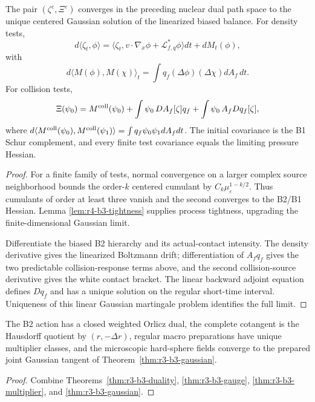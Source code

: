 \begin{theorem}
\label{thm:r3-b3-gaussian}
The pair \((\zeta^\varepsilon,\Xi^\varepsilon)\) converges in the preceding
nuclear dual path space to the unique centered Gaussian solution of the
linearized biased balance.  For density tests,
\[
 d\langle\zeta_t,\phi\rangle
 =\langle\zeta_t,
 v\cdot\nabla_x\phi+\mathcal L_{f,q}^*\phi\rangle dt
 +dM_t(\phi),
\]
with
\[
 d\langle M(\phi),M(\chi)\rangle_t
 =\int q_f(\Delta\phi)(\Delta\chi)dA_f\,dt.
\]
For collision tests,
\[
 \Xi(\psi_0)
 =M^{\rm coll}(\psi_0)
 +\int\psi_0\,D A_f[\zeta]q_f
 +\int\psi_0\,A_fDq_f[\zeta],
\]
where
\(d\langle M^{\rm coll}(\psi_0),M^{\rm coll}(\psi_1)\rangle
 =\int q_f\psi_0\psi_1dA_fdt\).
The initial covariance is the B1 Schur complement, and every finite test
covariance equals the limiting pressure Hessian.
\end{theorem}

\begin{proof}
For a finite family of tests, normal convergence on a larger complex source
neighborhood bounds the order-\(k\) centered cumulant by
\(C_k\mu_\varepsilon^{1-k/2}\).  Thus cumulants of order at least three
vanish and the second converges to the B2/B1 Hessian.  Lemma
\ref{lem:r4-b3-tightness} supplies process tightness, upgrading the
finite-dimensional Gaussian limit.

Differentiate the biased B2 hierarchy and its actual-contact intensity.  The
density derivative gives the linearized Boltzmann drift; differentiation of
\(A_fq_f\) gives the two predictable collision-response terms above, and the
second collision-source derivative gives the white contact bracket.  The
linear backward adjoint equation defines \(Dq_f\) and has a unique solution on
the regular short-time interval.  Uniqueness of this linear Gaussian martingale
problem identifies the full limit.
\end{proof}

\begin{theorem}
\label{thm:r3-b3-main}
The B2 action has a closed weighted Orlicz dual, the complete cotangent is the
Hausdorff quotient by \((r,-\Delta r)\), regular macro preparations have
unique multiplier classes, and the microscopic hard-sphere fields converge to
the prepared joint Gaussian tangent of
Theorem~\ref{thm:r3-b3-gaussian}.
\end{theorem}

\begin{proof}
Combine Theorems~\ref{thm:r3-b3-duality},
\ref{thm:r3-b3-gauge}, \ref{thm:r3-b3-multiplier}, and
\ref{thm:r3-b3-gaussian}.
\end{proof}
